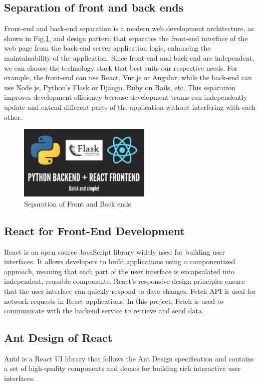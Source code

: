 \documentclass[journal]{IEEEtran}
\begin{document}
\subsection{Separation of front and back ends}
Front-end and back-end separation is a modern web development architecture, as shown in Fig.\ref{fig:Separation}, and design pattern that separates the front-end interface of the web page from the back-end server application logic, enhancing the maintainability of the application. Since front-end and back-end are independent, we can choose the technology stack that best suits our respective needs. For example, the front-end can use React, Vue.js or Angular, while the back-end can use Node.js, Python's Flask or Django, Ruby on Rails, etc. This separation improves development efficiency because development teams can independently update and extend different parts of the application without interfering with each other.

\begin{figure}[!t]
  \centering
  \includegraphics[width=2.5in]{figures/Preliminaries1.png}
  \caption{Separation of Front and Back ends}
  \label{fig:Separation}
  \end{figure}

\subsection{React for Front-End Development }
React is an open source JavaScript library widely used for building user interfaces. It allows developers to build applications using a componentized approach, meaning that each part of the user interface is encapsulated into independent, reusable components. React's responsive design principles ensure that the user interface can quickly respond to data changes. Fetch API is used for network requests in React applications. In this project, Fetch is used to communicate with the backend service to retrieve and send data.

\subsection{Ant Design of React}
Antd is a React UI library that follows the Ant Design specification and contains a set of high-quality components and demos for building rich interactive user interfaces.
\end{document}
